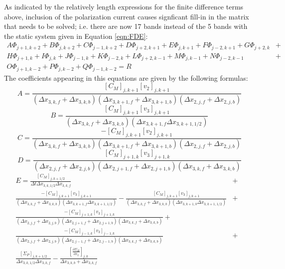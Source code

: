\documentclass[11pt,letterpaper]{article}
\begin{document}
As indicated by the relatively length expressions for the finite difference terms above, inclusion of the polarization current causes signficant fill-in in the matrix that needs to be solved; i.e. there are now 17 bands instead of the 5 bands with the static system given in Equation \ref{eqn:FDE}:  
\begin{eqnarray}
A \Phi_{j+1,k+2} + B \Phi_{j,k+2} + C \Phi_{j-1,k+2} + D \Phi_{j+2,k+1} +  E \Phi_{j,k+1} + F \Phi_{j-2,k+1} + G \Phi_{j+2,k} &+& \nonumber \\
 H \Phi_{j+1,k} + I \Phi_{j,k} + J \Phi_{j-1,k} + K \Phi_{j-2,k} + L \Phi_{j+2,k-1} + M \Phi_{j,k-1} + N \Phi_{j-2,k-1} &+& \nonumber \\
  O \Phi_{j+1,k-2} + P \Phi_{j,k-2} + Q \Phi_{j-1,k-2} = R
\end{eqnarray}
The coefficients appearing in this equations are given by the following formulas:
\begin{equation}
A = \frac{[C_M]_{j,k+1} [v_2]_{j,k+1} }{ \left( \Delta x_{3,k,f}+\Delta x_{3,k,b} \right) \left( \Delta x_{3,k+1,f}+\Delta x_{3,k+1,b} \right) \left( \Delta x_{2,j,f}+\Delta x_{2,j,b} \right) }
\end{equation}
\begin{equation}
B = \frac{[C_M]_{j,k+1} [v_{3}]_{j,k+1}}{\left( \Delta x_{3,k,f} + \Delta x_{3,k,b} \right) \left( \Delta x_{3,k+1,f} \Delta x_{3,k+1,1/2} \right)}
\end{equation}
\begin{equation}
C = \frac{-[C_M]_{j,k+1} [v_2]_{j,k+1} }{ \left( \Delta x_{3,k,f}+\Delta x_{3,k,b} \right) \left( \Delta x_{3,k+1,f}+\Delta x_{3,k+1,b} \right) \left( \Delta x_{2,j,f}+\Delta x_{2,j,b} \right) }
\end{equation}
\begin{equation}
D = \frac{[C_M]_{j+1,k} [v_3]_{j+1,k} }{ \left( \Delta x_{2,j,f}+\Delta x_{2,j,b} \right) \left( \Delta x_{2,j+1,f}+\Delta x_{2,j+1,b} \right) \left( \Delta x_{3,k,f}+\Delta x_{3,k,b} \right) }
\end{equation}
\begin{eqnarray}
E = \frac{[C_M]_{j,k+1/2}}{\Delta t \Delta x_{3,k,1/2} \Delta x_{3,k,f}} &+& \nonumber \\
\frac{-[C_M]_{j,k+1} [v_{3}]_{j,k+1}}{\left( \Delta x_{3,k,f} + \Delta x_{3,k,b} \right) \left( \Delta x_{3,k+1,f} \Delta x_{3,k+1,1/2} \right)} - \frac{[C_M]_{j,k+1} [v_{3}]_{j,k+1}}{\left( \Delta x_{3,k,f} + \Delta x_{3,k,b} \right) \left( \Delta x_{3,k+1,b} \Delta x_{3,k+1,1/2} \right)} &+& \nonumber \\
\frac{-[C_M]_{j+1,k} [v_3]_{j+1,k} }{ \left( \Delta x_{2,j,f}+\Delta x_{2,j,b} \right) \left( \Delta x_{2,j+1,f}+\Delta x_{2,j+1,b} \right) \left( \Delta x_{3,k,f}+\Delta x_{3,k,b} \right) } + &~& \nonumber \\
 \frac{-[C_M]_{j-1,k} [v_3]_{j-1,k} }{ \left( \Delta x_{2,j,f}+\Delta x_{2,j,b} \right) \left( \Delta x_{2,j-1,f}+\Delta x_{2,j-1,b} \right) \left( \Delta x_{3,k,f}+\Delta x_{3,k,b} \right) } &+& \nonumber \\
\frac{ \left[ \Sigma_P \right]_{j,k+1/2}}{\Delta x_{3,k,1/2} \Delta x_{3,k,f}} - \frac{ \left[ \frac{\partial \Sigma_H}{\partial x_2} \right]_{j,k}}{\Delta x_{3,k,b} + \Delta x_{3,k,f}} 
\end{eqnarray}
\end{document}
